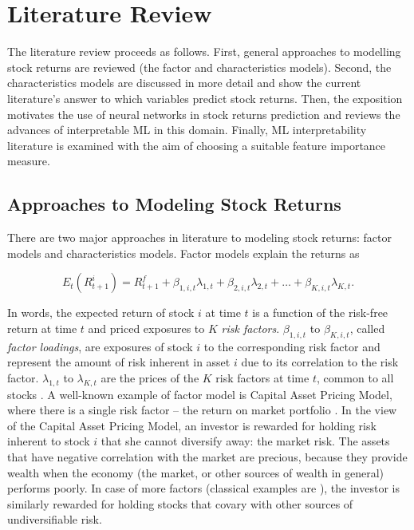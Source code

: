 \chapter{Literature Review}
\label{chap:lit} 
		 	
 	The literature review proceeds as follows. First, general approaches to modelling stock returns are reviewed (the factor and characteristics models). Second, the characteristics models are discussed in more detail and show the current literature's answer to which variables predict stock returns. Then, the exposition motivates the use of neural networks in stock returns prediction and reviews the advances of interpretable ML in this domain. Finally, ML interpretability literature is examined with the aim of choosing a suitable feature importance measure.
 	
 	\section {Approaches to Modeling Stock Returns}
 	
 	There are two major approaches in literature to modeling stock returns: factor models and characteristics models. Factor models explain the returns as  
 	
 	\begin{equation}
 		E_t(R^i_{t+1}) = R^f_{t+1} + \beta_{1,i,t} \lambda_{1,t} + \beta_{2,i,t} \lambda_{2,t} + \ldots +  \beta_{K,i,t} \lambda_{K,t}. 
 	\end{equation}
 
 	In words, the expected return of stock $i$ at time $t$ is a function of the risk-free return at time $t$ and priced exposures to $K$ \textit{risk factors}. $\beta_{1, i, t}$ to $\beta_{K, i, t}$, called \textit{factor loadings},  are exposures of stock $i$ to the corresponding risk factor and represent the amount of risk inherent in asset $i$ due to its correlation to the risk factor. $\lambda_{1,t}$ to $\lambda_{K,t}$ are the prices of the $K$ risk factors at time $t$, common to all stocks \citep{kelly2019characteristics}. A well-known example of factor model is Capital Asset Pricing Model, where there is a single risk factor -- the return on market portfolio \citep{cochrane2009asset}. In the view of the Capital Asset Pricing Model, an investor is rewarded for holding risk inherent to stock $i$ that she cannot diversify away: the market risk. The assets that have negative correlation with the market are precious, because they provide wealth when the economy (the market, or other sources of wealth in general) performs poorly. In case of more factors (classical examples are \cite{fama1996multifactor, fama2015five}), the investor is similarly rewarded for holding stocks that covary with other sources of undiversifiable risk. 

